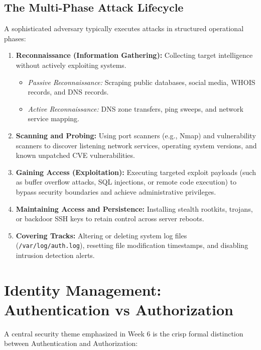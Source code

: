 \subsection{The Multi-Phase Attack Lifecycle}
A sophisticated adversary typically executes attacks in structured operational phases:
\begin{enumerate}[leftmargin=*]
  \item \textbf{Reconnaissance (Information Gathering):} Collecting target intelligence without actively exploiting systems.
    \begin{itemize}
      \item \emph{Passive Reconnaissance:} Scraping public databases, social media, WHOIS records, and DNS records.
      \item \emph{Active Reconnaissance:} DNS zone transfers, ping sweeps, and network service mapping.
    \end{itemize}
  \item \textbf{Scanning and Probing:} Using port scanners (e.g., Nmap) and vulnerability scanners to discover listening network services, operating system versions, and known unpatched CVE vulnerabilities.
  \item \textbf{Gaining Access (Exploitation):} Executing targeted exploit payloads (such as buffer overflow attacks, SQL injections, or remote code execution) to bypass security boundaries and achieve administrative privileges.
  \item \textbf{Maintaining Access and Persistence:} Installing stealth rootkits, trojans, or backdoor SSH keys to retain control across server reboots.
  \item \textbf{Covering Tracks:} Altering or deleting system log files (\texttt{/var/log/auth.log}), resetting file modification timestamps, and disabling intrusion detection alerts.
\end{enumerate}

\section{Identity Management: Authentication vs Authorization}
A central security theme emphasized in Week 6 is the crisp formal distinction between Authentication and Authorization:

